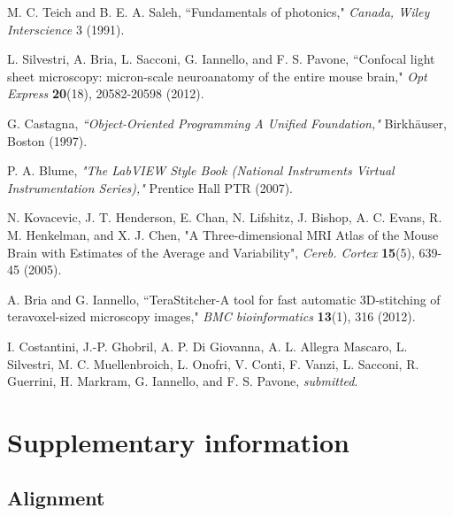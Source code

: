 \documentclass[12pt]{spieman}  %
\begin{document}
\begin{thebibliography}{0}
 M. C. Teich and B. E. A. Saleh, ``Fundamentals of photonics," \emph{Canada, Wiley Interscience} 3 (1991).

 L. Silvestri, A. Bria, L. Sacconi, G. Iannello,  and F. S. Pavone,  ``Confocal light sheet microscopy: micron-scale neuroanatomy of the entire mouse brain," \emph{Opt Express} \textbf{20}(18), 20582-20598 (2012).

 G. Castagna, \emph{``Object-Oriented Programming A Unified Foundation,"} Birkh{\"a}user, Boston (1997).

 P. A. Blume, \emph{"The LabVIEW Style Book (National Instruments Virtual Instrumentation Series),"} Prentice Hall PTR (2007).

 N. Kovacevic, J. T. Henderson, E. Chan, N. Lifshitz, J. Bishop, A. C. Evans, R. M. Henkelman, and X. J. Chen, "A Three-dimensional MRI Atlas of the Mouse Brain with Estimates of the Average and Variability", \emph{Cereb. Cortex} \textbf{15}(5), 639-45 (2005).



 A. Bria and G. Iannello,  ``TeraStitcher-A tool for fast automatic 3D-stitching of teravoxel-sized microscopy images,"  \emph{BMC bioinformatics} \textbf{13}(1), 316 (2012).

 I. Costantini, J.-P. Ghobril, A. P. Di Giovanna, A. L. Allegra Mascaro, L. Silvestri, M. C. Muellenbroich, L. Onofri, V. Conti, F. Vanzi, L. Sacconi, R. Guerrini, H. Markram, G. Iannello, and F. S. Pavone, \emph{submitted}.

\end{thebibliography}


\listoffigures



\listoftables

\section{Supplementary information}

\subsection{Alignment}
\end{document}
